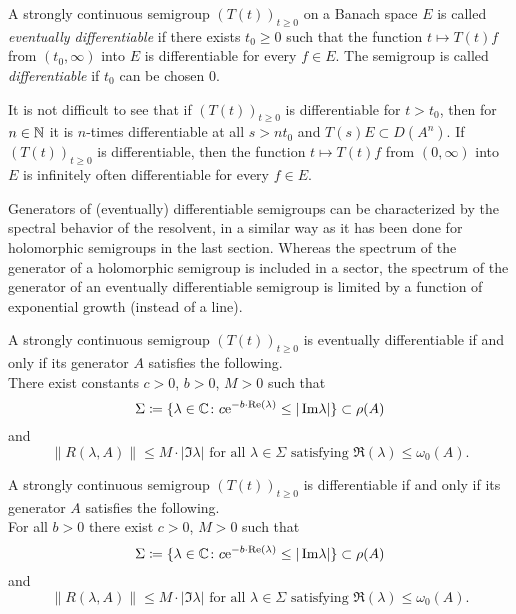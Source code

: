 \begin{definition}\label{def:a2-1.16}
A strongly continuous semigroup $(T(t))_{t \geq 0}$ on a Banach space $E$ is called \emph{eventually differentiable} if there exists $t_0 \geq 0$ such that the function $t \mapsto T(t)f$ from $(t_0,\infty)$ into $E$ is differentiable for every $f \in E$.
The semigroup is called \emph{differentiable} if $t_0$ can be chosen $0$.
\end{definition}

It is not difficult to see that if $(T(t))_{t \geq 0}$ is differentiable for $t > t_{0}$, then for $n \in \mathbb{N}$ it is $n$-times differentiable at all $s > nt_{0}$ and $T(s)E \subset D(A^n)$. 
If $(T(t))_{t\geq 0}$ is differentiable, then the function $t \mapsto T(t)f$ from $(0,\infty)$ into $E$ is infinitely often differentiable for every $f \in E$.

Generators of (eventually) differentiable semigroups 
can be characterized by the spectral behavior of the resolvent,
in a similar way as it has been done for holomorphic semigroups in the last section.
Whereas the spectrum of the generator of a holomorphic semigroup is included in a sector, the spectrum of the generator of an eventually differentiable semigroup is limited by a function of exponential growth (instead of a line).
\begin{theorem}\label{thm:a2-1.17}
A strongly continuous semigroup $(T(t))_{t\geq 0}$ is eventually differentiable if and only if its generator $A$ satisfies the following. \\
There exist constants $c>0$, $b>0$, $M>0$ such that
\[
    \Sigma \coloneqq \{\lambda \in \mathbb{C} \colon c\mathrm{e}^{-b\cdot \mathop{}\!\mathrm{Re}(\lambda)} \leq |\mathop{}\!\mathrm{Im}\lambda|\} \subset \rho(A)
\]
and
\[
    \|R(\lambda,A)\| \leq M\cdot|\Im\lambda| \text{ for all } \lambda \in \Sigma \text{ satisfying } \Re(\lambda) \leq \omega_{0}(A).
\]
\end{theorem}

\begin{theorem}\label{thm:a2-1.18}
A strongly continuous semigroup $(T(t))_{t\geq 0}$ is differentiable if and only if its generator $A$ satisfies the following. \\
For all $b>0$ there exist $c>0$, $M>0$ such that
\[
    \Sigma \coloneqq \{\lambda \in \mathbb{C} \colon c\mathrm{e}^{-b\cdot \mathop{}\!\mathrm{Re}(\lambda)} \leq |\mathop{}\!\mathrm{Im}\lambda|\} \subset \rho(A)
\]
and
\[
    \|R(\lambda,A)\| \leq M\cdot|\Im\lambda| \text{ for all } \lambda \in \Sigma \text{ satisfying } \Re(\lambda) \leq \omega_{0}(A).
\]
\end{theorem}

